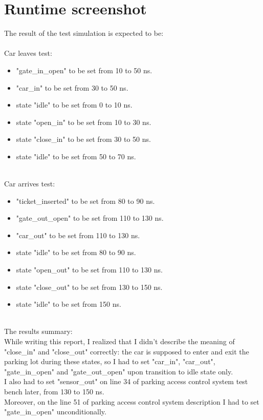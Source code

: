 \documentclass{article}
\begin{document}
	\section*{Runtime screenshot}
	The result of the test simulation is expected to be: \\
	\ \\
	Car leaves test:
	\begin{itemize}[nosep]
		\item "gate\_in\_open" to be set from 10 to 50 ns.
		\item "car\_in" to be set from 30 to 50 ns.
		\item state "idle" to be set from 0 to 10 ns.
		\item state "open\_in" to be set from 10 to 30 ns.
		\item state "close\_in" to be set from 30 to 50 ns.
		\item state "idle" to be set from 50 to 70 ns.
	\end{itemize}
	\ \\
	Car arrives test:
	\begin{itemize}[nosep]
		\item "ticket\_inserted" to be set from 80 to 90 ns.
		\item "gate\_out\_open" to be set from 110 to 130 ns.
		\item "car\_out" to be set from 110 to 130 ns.
		\item state "idle" to be set from 80 to 90 ns.
		\item state "open\_out" to be set from 110 to 130 ns.
		\item state "close\_out" to be set from 130 to 150 ns.
		\item state "idle" to be set from 150 ns.
	\end{itemize}
	\ \\
	The results summary: \\
	While writing this report, I realized that I didn't describe the meaning of "close\_in" and "close\_out" correctly: the car is supposed to enter and exit the parking lot during these states, so I had to set "car\_in", "car\_out", "gate\_in\_open" and "gate\_out\_open" upon transition to idle state only. \\
	I also had to set "sensor\_out" on line 34 of parking access control system test bench later, from 130 to 150 ns.\\
	Moreover, on the line 51 of parking access control system description I had to set "gate\_in\_open" unconditionally. \\
\end{document}
